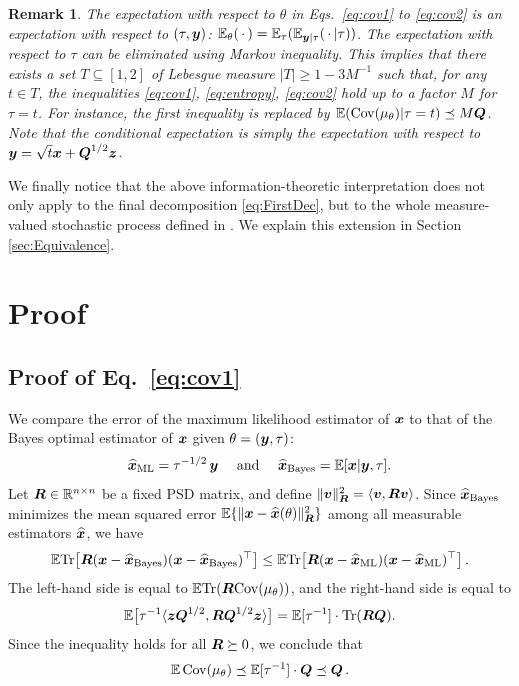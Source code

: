 \documentclass[11pt]{article}
\numberwithin{equation}{section}
\theoremstyle{myremark}
\newtheorem{remark}{Remark}[section]
\theoremstyle{myremark}
\theoremstyle{myexample}
\newcommand{\R}{\mathbb{R}}
\newcommand{\1}{\mathbf{1}}
\newcommand{\sMLE}{\mathrm{\tiny{ML}}}
\newcommand{\sB}{\mathrm{\tiny{Bayes}}}
\begin{document}
\begin{remark}
The expectation with respect to $\theta$ in Eqs.~\eqref{eq:cov1} to \eqref{eq:cov2}
is an expectation with respect to $(\tau,{\boldsymbol{y}})$: ${\mathbb E}_{\theta}(\,\cdot\,)=
 {\mathbb E}_{\tau}({\mathbb E}_{{\boldsymbol{y}}|\tau}(\,\cdot\,|\tau))$. The expectation with respect to
 $\tau$ can be eliminated  using Markov inequality. This implies
 that there exists a set $T\subseteq [1,2]$ of Lebesgue measure $|T|\ge 1-3M^{-1}$
 such that, for any $t\in T$, the inequalities 
 \eqref{eq:cov1}, \eqref{eq:entropy}, \eqref{eq:cov2} hold up to a factor $M$
 for $\tau=t$. For instance, the first inequality is replaced by
 ${\mathbb E}({\rm Cov}(\mu_{\theta})|\tau=t)\preceq M{\boldsymbol{Q}}$. Note that the conditional expectation
 is simply the expectation with respect to ${\boldsymbol{y}} = \sqrt{t}{\boldsymbol{x}} +{\boldsymbol{Q}}^{1/2}{\boldsymbol{z}}$.
 \end{remark}

We finally notice that the above information-theoretic interpretation
 does not only apply to the final decomposition \eqref{eq:FirstDec}, but to the whole
 measure-valued stochastic process defined in \cite{eldan2020taming}. We
 explain this extension in Section \ref{sec:Equivalence}.


\section{Proof}

\subsection{Proof of Eq.~\eqref{eq:cov1}}
 We compare the error of the maximum likelihood estimator of ${\boldsymbol{x}}$ to
  that of the Bayes optimal estimator of ${\boldsymbol{x}}$ given $\theta=({\boldsymbol{y}},\tau)$: 
  \begin{align*}
\hbx_{\sMLE} = \tau^{-1/2} \, \by~~~~\mbox{and} ~~~~ \hbx_{\sB} = \E[\bx | \by,\tau].
 \end{align*}
Let $\bR \in \R^{n \times n}$ be a fixed PSD matrix, and define
$\|{\boldsymbol{v}}\|_{{\boldsymbol R}}^2=\langle{\boldsymbol{v}},{\boldsymbol R}{\boldsymbol{v}}\rangle$. Since $\hbx_{\sB}$ minimizes 
the mean squared error ${\mathbb E} \{\|{\boldsymbol{x}} - \boldsymbol{\widehat{x}}(\theta)\|_{{\boldsymbol R}}^2\}$ among all measurable 
estimators  $\boldsymbol{\widehat{x}}$, we have
%
\begin{align}
%
\E  \Tr\big[\bR(\bx - \hbx_{\sB})(\bx - \hbx_{\sB})^{\top}\big] \le 
\E  \Tr\big[\bR(\bx - \hbx_{\sMLE})(\bx - \hbx_{\sMLE})^{\top}\big]\, .
%
\end{align}
The left-hand side is equal to ${\mathbb E} {\rm Tr}({\boldsymbol R}{\rm Cov}(\mu_{\theta}))$, and the right-hand side is equal to
%
\begin{align}
% 
\E\big[\tau^{-1}\<\bz \bQ^{1/2},\bR \bQ^{1/2} \bz\>\big] = \E[\tau^{-1}] \cdot \Tr(\bR\bQ).
%
\end{align}
Since the inequality holds for all ${\boldsymbol R} \succeq 0$, we conclude that
%
\begin{align}
{\mathbb E}\, {\rm Cov}(\mu_{\theta}) \preceq {\mathbb E}[\tau^{-1}] \cdot {\boldsymbol{Q}} \preceq {\boldsymbol{Q}}\, .
\end{align}
\end{document}

